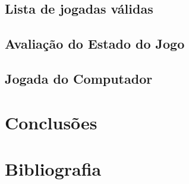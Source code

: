 \documentclass[a4paper,11pt,portuguese]{article}
\begin{document}


    \subsection{Lista de jogadas válidas}



    \subsection{Avaliação do Estado do Jogo}



    \subsection{Jogada do Computador}



\section{Conclusões}



\section{Bibliografia}

\end{document}
